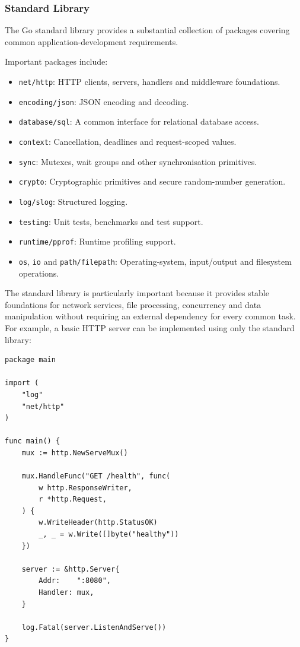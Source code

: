 \subsubsection{Standard Library}

The Go standard library provides a substantial collection of packages covering common application-development requirements.

Important packages include:

\begin{itemize}
    \item \texttt{net/http}: HTTP clients, servers, handlers and middleware foundations.
    \item \texttt{encoding/json}: JSON encoding and decoding.
    \item \texttt{database/sql}: A common interface for relational database access.
    \item \texttt{context}: Cancellation, deadlines and request-scoped values.
    \item \texttt{sync}: Mutexes, wait groups and other synchronisation primitives.
    \item \texttt{crypto}: Cryptographic primitives and secure random-number generation.
    \item \texttt{log/slog}: Structured logging.
    \item \texttt{testing}: Unit tests, benchmarks and test support.
    \item \texttt{runtime/pprof}: Runtime profiling support.
    \item \texttt{os}, \texttt{io} and \texttt{path/filepath}: Operating-system, input/output and filesystem operations.
\end{itemize}

The standard library is particularly important because it provides stable foundations for network services, file processing, concurrency and data manipulation without requiring an external dependency for every common task.\\

For example, a basic HTTP server can be implemented using only the standard library:

\begin{lstlisting}
package main

import (
    "log"
    "net/http"
)

func main() {
    mux := http.NewServeMux()

    mux.HandleFunc("GET /health", func(
        w http.ResponseWriter,
        r *http.Request,
    ) {
        w.WriteHeader(http.StatusOK)
        _, _ = w.Write([]byte("healthy"))
    })

    server := &http.Server{
        Addr:    ":8080",
        Handler: mux,
    }

    log.Fatal(server.ListenAndServe())
}
\end{lstlisting}

